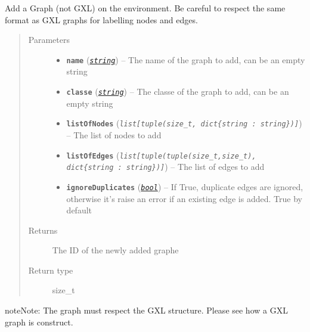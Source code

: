 \documentclass[letterpaper,10pt,english]{sphinxmanual}
\begin{document}
\begin{fulllineitems}
\label{doc:PythonGedLib.addRandomGraph}
Add a Graph (not GXL) on the environment. Be careful to respect the same format as GXL graphs for labelling nodes and edges.
\begin{quote}\begin{description}
\item[{Parameters}] \leavevmode\begin{itemize}
\item {} 
\textbf{\texttt{name}} (\href{https://docs.python.org/3/library/string.html\#module-string}{\emph{\texttt{string}}}) -- The name of the graph to add, can be an empty string

\item {} 
\textbf{\texttt{classe}} (\href{https://docs.python.org/3/library/string.html\#module-string}{\emph{\texttt{string}}}) -- The classe of the graph to add, can be an empty string

\item {} 
\textbf{\texttt{listOfNodes}} (\emph{\texttt{list{[}tuple(size\_t, dict\{string : string\}){]}}}) -- The list of nodes to add

\item {} 
\textbf{\texttt{listOfEdges}} (\emph{\texttt{list{[}tuple(tuple(size\_t,size\_t), dict\{string : string\}){]}}}) -- The list of edges to add

\item {} 
\textbf{\texttt{ignoreDuplicates}} (\href{https://docs.python.org/3/library/functions.html\#bool}{\emph{\texttt{bool}}}) -- If True, duplicate edges are ignored, otherwise it's raise an error if an existing edge is added. True by default

\end{itemize}

\item[{Returns}] \leavevmode
The ID of the newly added graphe

\item[{Return type}] \leavevmode
size\_t

\end{description}\end{quote}

\begin{notice}{note}{Note:}
The graph must respect the GXL structure. Please see how a GXL graph is construct.
\end{notice}

\end{fulllineitems}
\end{document}
